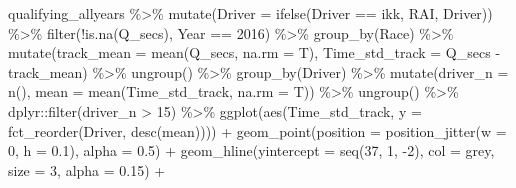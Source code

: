 \documentclass[
]{book}
\newenvironment{Shaded}{\begin{snugshade}}{\end{snugshade}}
\newcommand{\AttributeTok}[1]{\textcolor[rgb]{0.77,0.63,0.00}{#1}}
\newcommand{\DecValTok}[1]{\textcolor[rgb]{0.00,0.00,0.81}{#1}}
\newcommand{\FloatTok}[1]{\textcolor[rgb]{0.00,0.00,0.81}{#1}}
\newcommand{\FunctionTok}[1]{\textcolor[rgb]{0.00,0.00,0.00}{#1}}
\newcommand{\NormalTok}[1]{#1}
\newcommand{\SpecialCharTok}[1]{\textcolor[rgb]{0.00,0.00,0.00}{#1}}
\newcommand{\StringTok}[1]{\textcolor[rgb]{0.31,0.60,0.02}{#1}}
\begin{document}
\begin{Shaded}
\begin{Highlighting}[]
\NormalTok{qualifying\_allyears }\SpecialCharTok{\%\textgreater{}\%}
  \FunctionTok{mutate}\NormalTok{(}\AttributeTok{Driver =} \FunctionTok{ifelse}\NormalTok{(Driver }\SpecialCharTok{==} \StringTok{\textquotesingle{}ikk\textquotesingle{}}\NormalTok{, }\StringTok{\textquotesingle{}RAI\textquotesingle{}}\NormalTok{, Driver)) }\SpecialCharTok{\%\textgreater{}\%} 
  \FunctionTok{filter}\NormalTok{(}\SpecialCharTok{!}\FunctionTok{is.na}\NormalTok{(Q\_secs),}
\NormalTok{         Year }\SpecialCharTok{==} \DecValTok{2016}\NormalTok{) }\SpecialCharTok{\%\textgreater{}\%}
  \FunctionTok{group\_by}\NormalTok{(Race) }\SpecialCharTok{\%\textgreater{}\%}
  \FunctionTok{mutate}\NormalTok{(}\AttributeTok{track\_mean =} \FunctionTok{mean}\NormalTok{(Q\_secs, }\AttributeTok{na.rm =}\NormalTok{ T),}
         \AttributeTok{Time\_std\_track =}\NormalTok{ Q\_secs }\SpecialCharTok{{-}}\NormalTok{ track\_mean) }\SpecialCharTok{\%\textgreater{}\%} 
  \FunctionTok{ungroup}\NormalTok{() }\SpecialCharTok{\%\textgreater{}\%} 
  \FunctionTok{group\_by}\NormalTok{(Driver) }\SpecialCharTok{\%\textgreater{}\%} 
  \FunctionTok{mutate}\NormalTok{(}\AttributeTok{driver\_n =} \FunctionTok{n}\NormalTok{(),}
         \AttributeTok{mean =} \FunctionTok{mean}\NormalTok{(Time\_std\_track, }\AttributeTok{na.rm =}\NormalTok{ T)) }\SpecialCharTok{\%\textgreater{}\%}
  \FunctionTok{ungroup}\NormalTok{() }\SpecialCharTok{\%\textgreater{}\%}
\NormalTok{  dplyr}\SpecialCharTok{::}\FunctionTok{filter}\NormalTok{(driver\_n }\SpecialCharTok{\textgreater{}} \DecValTok{15}\NormalTok{) }\SpecialCharTok{\%\textgreater{}\%} 
  \FunctionTok{ggplot}\NormalTok{(}\FunctionTok{aes}\NormalTok{(Time\_std\_track, }\AttributeTok{y =} \FunctionTok{fct\_reorder}\NormalTok{(Driver, }\FunctionTok{desc}\NormalTok{(mean)))) }\SpecialCharTok{+}
  \FunctionTok{geom\_point}\NormalTok{(}\AttributeTok{position =} \FunctionTok{position\_jitter}\NormalTok{(}\AttributeTok{w =} \DecValTok{0}\NormalTok{, }\AttributeTok{h =} \FloatTok{0.1}\NormalTok{), }\AttributeTok{alpha =} \FloatTok{0.5}\NormalTok{) }\SpecialCharTok{+}
  \FunctionTok{geom\_hline}\NormalTok{(}\AttributeTok{yintercept =} \FunctionTok{seq}\NormalTok{(}\DecValTok{37}\NormalTok{, }\DecValTok{1}\NormalTok{, }\SpecialCharTok{{-}}\DecValTok{2}\NormalTok{), }\AttributeTok{col =} \StringTok{\textquotesingle{}grey\textquotesingle{}}\NormalTok{, }\AttributeTok{size =} \DecValTok{3}\NormalTok{, }\AttributeTok{alpha =} \FloatTok{0.15}\NormalTok{) }\SpecialCharTok{+}

\end{Highlighting}
\end{Shaded}
\end{document}
